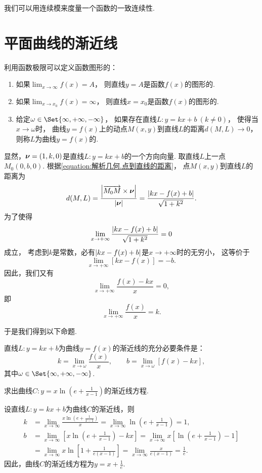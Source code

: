 我们可以用连续模来度量一个函数的一致连续性.

\section{平面曲线的渐近线}
\begin{definition}
利用函数极限可以定义函数图形的：
\begin{enumerate}
	\item 如果\(\lim_{x \to \infty}f(x) = A\)，
	则直线\(y = A\)是函数\(f(x)\)的图形的.
	\item 如果\(\lim_{x \to x_0}f(x) = \infty\)，
	则直线\(x = x_0\)是函数\(f(x)\)的图形的.
	\item 给定\(\omega\in\Set{\infty,+\infty,-\infty}\)，
	如果存在直线\(L: y = kx+b\ (k \neq 0)\)，
	使得当\(x\to\omega\)时，
	曲线\(y = f(x)\)上的动点\(M(x,y)\)到直线\(L\)的距离\(d(M,L)\to0\)，
	则称\(L\)为曲线\(y = f(x)\)的.
\end{enumerate}
\end{definition}

显然，\(\boldsymbol{\nu}=(1,k,0)\)是直线\(L: y=kx+b\)的一个方向向量.
取直线\(L\)上一点\(M_0(0,b,0)\).
根据\cref{equation:解析几何.点到直线的距离}，
点\(M(x,y)\)到直线\(L\)的距离为\[
	d(M,L)=\frac{\abs{\overrightarrow{M_0M}\times\boldsymbol{\nu}}}{\abs{\boldsymbol{\nu}}}
	=\frac{
		\abs{kx-f(x)+b}
	}{
		\sqrt{1+k^2}
	}.
\]
为了使得\[
	\lim_{x\to+\infty} \frac{\abs{kx-f(x)+b}}{\sqrt{1+k^2}} = 0
\]成立，
考虑到\(k\)是常数，必有\(\abs{kx-f(x)+b}\)是\(x\to+\infty\)时的无穷小，
这等价于\[
	\lim_{x\to+\infty} [kx-f(x)] = -b.
\]
因此，我们又有\[
	\lim_{x\to+\infty} \frac{f(x)-kx}{x}=0,
\]
即\[
	\lim_{x\to+\infty} \frac{f(x)}{x}=k.
\]

于是我们得到以下命题.
\begin{proposition}
直线\(L: y = kx+b\)为曲线\(y = f(x)\)的渐近线的充分必要条件是：\[
	k = \lim_{x\to\omega} \frac{f(x)}{x},
	\qquad
	b = \lim_{x\to\omega} \left[f(x) - kx\right],
\]
其中\(\omega\in\Set{\infty,+\infty,-\infty}\).
\end{proposition}

\begin{example}
求出曲线\(C: y = x \ln\left(e+\frac{1}{x-1}\right)\)的渐近线方程.
\begin{solution}
设直线\(L: y = kx+b\)为曲线\(C\)的渐近线，则\begin{align*}
	k &= \lim_{x\to\infty} \frac{x \ln\left(e+\frac{1}{x-1}\right)}{x}
	= \lim_{x\to\infty} \ln\left(e+\frac{1}{x-1}\right)
	= 1, \\
	b &= \lim_{x\to\infty} \left[ x \ln\left(e+\frac{1}{x-1}\right) - kx \right]
	= \lim_{x\to\infty} x \left[ \ln\left(e+\frac{1}{x-1}\right) - 1 \right] \\
	&= \lim_{x\to\infty} x \ln\left[1+\frac{1}{e(x-1)}\right]
	= \lim_{x\to\infty} \frac{x}{e(x-1)}
	= \frac{1}{e}.
\end{align*}
因此，曲线\(C\)的渐近线方程为\(y = x + \frac{1}{e}\).
\end{solution}
\end{example}

